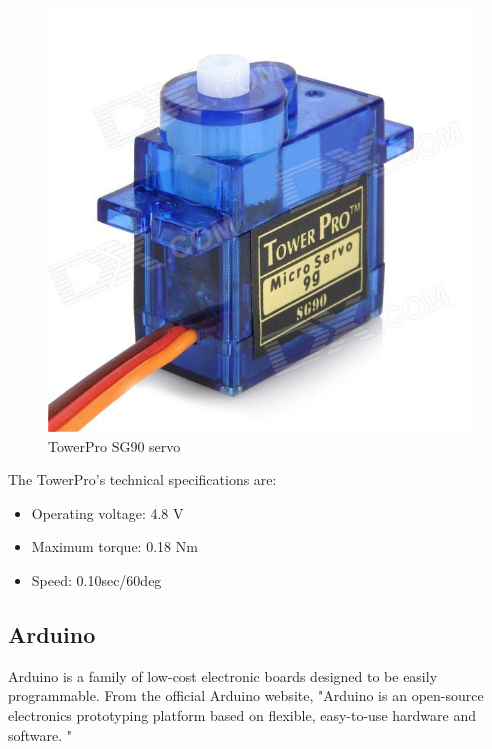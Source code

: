		\begin{figure}[H]
			\centering
			\includegraphics[scale=0.25]{images/ProjectComponents/servo2.jpg}
			\caption{TowerPro SG90 servo }
			\label{towerpro}
		\end{figure}
		\bigskip

	The TowerPro's technical specifications are:
			\begin{itemize}
				\item Operating voltage: 4.8 V
				\item Maximum torque: 0.18 Nm
				\item Speed: 0.10sec/60deg
			\end{itemize}	














\newpage
\subsection{Arduino}

	Arduino is a family of low-cost electronic boards designed to be easily programmable. From the official Arduino website, "Arduino is an open-source electronics prototyping platform based on flexible, easy-to-use hardware and software. "\\

